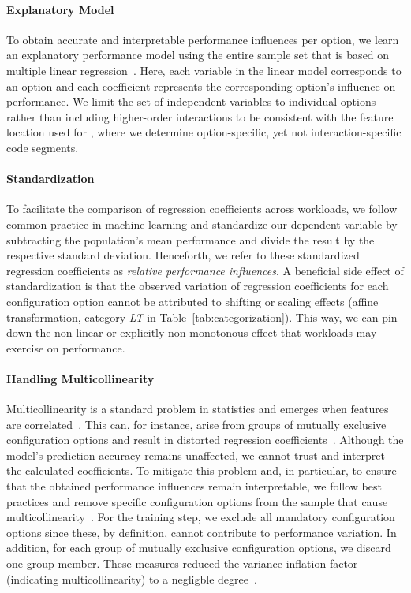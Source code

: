 {{{\paragraph*{Explanatory Model}
To obtain accurate and interpretable performance influences per option, we learn an explanatory performance model using the entire sample set that is based on multiple linear regression~\cite{dorn2020,siegmundPerformanceinfluenceModelsHighly2015,perLasso}. Here, each variable in the linear model corresponds to an option and each coefficient represents the corresponding option's influence on performance. 
We limit the set of independent variables to individual options rather than including higher-order interactions to be consistent with the feature location used for , where we determine option-specific, yet not interaction-specific code segments.
\paragraph*{Standardization}
To facilitate the comparison of regression coefficients across workloads, we follow common practice in machine learning and standardize our dependent variable by subtracting the population’s mean performance and divide the result by the respective standard deviation. Henceforth, we refer to these standardized regression coefficients as \textit{relative performance influences}. A beneficial side effect of standardization is that the observed variation of regression coefficients for each configuration option cannot be attributed to shifting or scaling effects (affine transformation, category \colorbox{lt-color}{\textit{LT}} in Table~\ref{tab:categorization}). This way, we can pin down  the non-linear or explicitly non-monotonous effect that workloads may exercise on performance.
\paragraph*{Handling Multicollinearity} Multicollinearity is a standard problem in statistics and emerges when features are correlated~\cite{Daoud_2017}. This can, for instance, arise from groups of mutually exclusive configuration options and result in distorted regression coefficients~\cite{dorn2020}. Although the model's prediction accuracy remains unaffected, we cannot trust and interpret the calculated coefficients. To mitigate this problem and, in particular, to ensure that the obtained performance influences remain interpretable, we follow best practices and remove specific configuration options from the sample that cause multicollinearity~\cite{dorn2020}. For the training step, we exclude all mandatory configuration options since these, by definition, cannot contribute to performance variation. In addition, for each group of mutually exclusive configuration options, we discard one group member. These measures reduced the variance inflation factor (indicating multicollinearity) to a negligble degree~\cite{o2007caution}.

}}}
